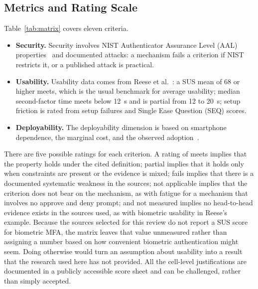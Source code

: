 \documentclass[sigconf]{acmart}
\begin{document}
\subsection{Metrics and Rating Scale}

Table~\ref{tab:matrix} covers eleven criteria.
\begin{itemize}
  \item \textbf{Security.} Security involves NIST Authenticator Assurance Level (AAL)
    properties~\cite{nist:2025:sp80063b4} and documented attacks: a mechanism
    fails a criterion if NIST restricts it, or a published attack is
    practical.
  \item \textbf{Usability.} Usability data comes from Reese et al.~\cite{reese:2019:2fa}: a SUS mean of 68 or higher meets, which is the usual benchmark for average usability; median second-factor time meets below 12~s and is partial from 12 to 20~s; setup friction is rated from setup failures and Single Ease Question (SEQ) scores.
  \item \textbf{Deployability.} The deployability dimension is based on smartphone dependence, the marginal cost, and the observed adoption~\cite{okta:2024:signin}.
\end{itemize}

There are five possible ratings for each criterion. A rating of meets implies that the
property holds under the cited definition; partial implies that it holds only when constraints are
present or the evidence is mixed; fails implies that there is a documented systematic weakness in
the sources; not applicable implies that the criterion does not bear on the mechanism, as with
fatigue for a mechanism that involves no approve and deny prompt; and not measured implies no
head-to-head evidence exists in the sources used, as with biometric usability in Reese's example.
Because the sources selected for this review do not report a SUS score for biometric MFA, the matrix leaves that value unmeasured rather than assigning a number based on how convenient biometric authentication might seem. Doing otherwise would turn an assumption about usability into a result that the research used here has not provided. All
the cell-level justifications are documented in a publicly accessible score sheet and can be
challenged, rather than simply accepted.
\end{document}
